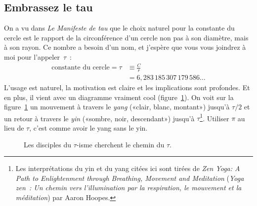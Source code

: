 
  \subsection{Embrassez le tau} %
  \label{sec:embrace_the_tau}

On a vu dans \emph{Le Manifeste de tau} que le choix naturel pour la constante
du cercle est le rapport de la circonférence d'un cercle non pas à son diamètre,
mais à son rayon. Ce nombre a besoin d'un nom, et j'espère que vous vous
joindrez à moi pour l'appeler~$\tau$~:
\[
\begin{split}
\mbox{constante du cercle} = \tau & \equiv \frac{C}{r} \\
                                  & = 6{,}283\,185\,307\,179\,586\ldots
\end{split}
\]
L'usage est naturel, la motivation est claire et les implications sont
profondes. Et en plus, il vient avec un diagramme vraiment cool
(figure~\ref{fig:tauism}). On voit sur la figure~\ref{fig:tauism} un mouvement à
travers le \emph{yang} («\ns clair, blanc, montant\ns ») jusqu'à $\tau/2$ et un
retour à travers le \emph{yin} («\ns sombre, noir, descendant\ns ») jusqu'à
$\tau$\ns\footnote{Les interprétations du yin et du yang citées ici sont tirées
de \emph{Zen Yoga: A Path to Enlightenment through Breathing, Movement and
Meditation} (\emph{Yoga zen~: Un chemin vers l'illumination par la respiration,
le mouvement et la méditation}) par Aaron Hoopes.}. Utiliser $\pi$ au lieu de
$\tau$, c'est comme avoir le yang sans le yin.

\begin{figure}
\begin{center}
\end{center}
\caption{Les disciples du $\tau$-isme cherchent le chemin du
$\tau$.\label{fig:tauism}}
\end{figure}



